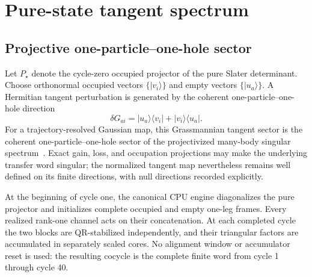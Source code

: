 \documentclass[aps,prb,twocolumn,floatfix,nofootinbib,superscriptaddress]{revtex4-2}
\begin{document}
\section{Pure-state tangent spectrum}

\subsection{Projective one-particle--one-hole sector}

Let $P_\star$ denote the cycle-zero occupied projector of the pure Slater
determinant.  Choose orthonormal occupied vectors
$\{\lvert v_i\rangle\}$ and empty vectors
$\{\lvert u_a\rangle\}$.  A Hermitian tangent perturbation is generated by
the coherent one-particle--one-hole direction
\begin{equation}
 \delta G_{ai}
 =\lvert u_a\rangle\langle v_i\rvert
 +\lvert v_i\rangle\langle u_a\rvert.
 \label{eq:tangent-direction}
\end{equation}
For a trajectory-resolved Gaussian map, this Grassmannian tangent sector is
the coherent one-particle--one-hole sector of the projectivized many-body
singular spectrum~\cite{BhuiyanGaussianTransfer2026,BhuiyanNambuTangent2026}.
Exact gain, loss, and occupation projections may make the underlying transfer
word singular; the normalized tangent map nevertheless remains well defined
on its finite directions, with null directions recorded explicitly.

At the beginning of cycle one, the canonical CPU engine diagonalizes the pure
projector and initializes complete occupied and empty one-leg frames.  Every
realized rank-one channel acts on their concatenation.  At each completed
cycle the two blocks are QR-stabilized independently, and their triangular
factors are accumulated in separately scaled cores.  No alignment window or
accumulator reset is used: the resulting cocycle is the complete finite word
from cycle 1 through cycle 40.
\end{document}
